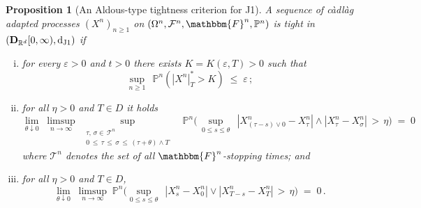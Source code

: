 \documentclass[11pt]{article}
\newtheorem{prop}[theorem]{Proposition}
\theoremstyle{definition}\newtheorem{example}[theorem]{Example}
\theoremstyle{definition}\newtheorem{counterexample}[theorem]{Counterexample}
\theoremstyle{definition}\newtheorem{remark}[theorem]{Remark}
\theoremstyle{definition}\newtheorem{defi}[theorem]{Definition}
\numberwithin{equation}{section}
\newcommand{\R}{\mathbb{R}}
\newcommand{\D}{{\bf D}}											%
\newcommand*\diff{\mathop{}\!\mathrm{d}}								%
\newcommand{\Pro}{\mathbb{P}}										%
\renewcommand{\sup}[1]{\underset{#1}{\operatorname{sup}}\;}					%
\renewcommand{\|}{\; : \, \;}											%
\newcommand{\dJ}{\diff_{\operatorname{J1}}}								%
\begin{document}
\begin{prop}[An Aldous-type tightness criterion for J1] \label{prop:alternative_J1_tightness_criterion}
	A sequence of càdlàg adapted processes $(X^n)_{n\ge 1}$ on $(\Omega^n, \mathcal{F}^n, \mathbbm{F}^n, \Pro^n)$ is tight in $(\D_{\R^d}[0,\infty), \dJ)$ if
	\begin{enumerate}[(i)]
		\item for every $\varepsilon>0$ and $t>0$ there exists $K=K(\varepsilon,T)>0$ such that 
		$$ \sup{n\ge 1} \, \Pro^n(|X^n|^*_T > K) \; \le \; \varepsilon \, ;$$
		\item for all $\eta>0$ and $T\in D$ it holds
		$$ \lim\limits_{\theta \downarrow 0} \; \limsup\limits_{n\to \infty} \; \sup{\substack{\tau,\,\sigma \in \, \mathcal{T}^n \\ 0\, \le \, \tau\,  \le\,  \sigma\, \le \, (\tau+\theta)\wedge T}} \; \; \Pro^n\biggl( \, \sup{0\le s \le \theta} \, |X^n_{(\tau-s)\vee 0}-X^n_\tau|\wedge |X^n_{\tau}-X^n_{\sigma}| \, > \, \eta \biggr) \; = \; 0 $$
		where $\mathcal{T}^n$ denotes the set of all $\mathbbm{F}^n$-stopping times; and 
		\item for all $\eta>0$ and $T\in D$, 
		$$ \lim\limits_{\theta \downarrow 0} \; \limsup\limits_{n\to \infty} \; \Pro^n \biggl( \sup{0\le s \le \theta}\, |X^n_s-X^n_0| \vee |X^n_{T-s}-X^n_T|\, > \, \eta \biggr) \; = \; 0 \,.$$
	\end{enumerate}
\end{prop}
\end{document}
